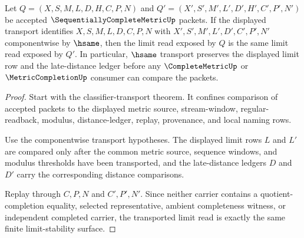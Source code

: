 \begin{theorem}
\label{thm:sequentially-complete-metric-limit-stability-obligation}
Let $Q=(X,S,M,L,D,H,C,P,N)$ and $Q'=(X',S',M',L',D',H',C',P',N')$ be accepted $\SequentiallyCompleteMetricUp$ packets. If the displayed transport identifies $X,S,M,L,D,C,P,N$ with $X',S',M',L',D',C',P',N'$ componentwise by $\hsame$, then the limit read exposed by $Q$ is the same limit read exposed by $Q'$. In particular, $\hsame$ transport preserves the displayed limit row and the late-distance ledger before any $\CompleteMetricUp$ or $\MetricCompletionUp$ consumer can compare the packets.
\end{theorem}
\begin{proof}
Start with the classifier-transport theorem. It confines comparison of accepted packets to the displayed metric source, stream-window, regular-readback, modulus, distance-ledger, replay, provenance, and local naming rows.

Use the componentwise transport hypotheses. The displayed limit rows $L$ and $L'$ are compared only after the common metric source, sequence windows, and modulus thresholds have been transported, and the late-distance ledgers $D$ and $D'$ carry the corresponding distance comparisons.

Replay through $C,P,N$ and $C',P',N'$. Since neither carrier contains a quotient-completion equality, selected representative, ambient completeness witness, or independent completed carrier, the transported limit read is exactly the same finite limit-stability surface.
\end{proof}

